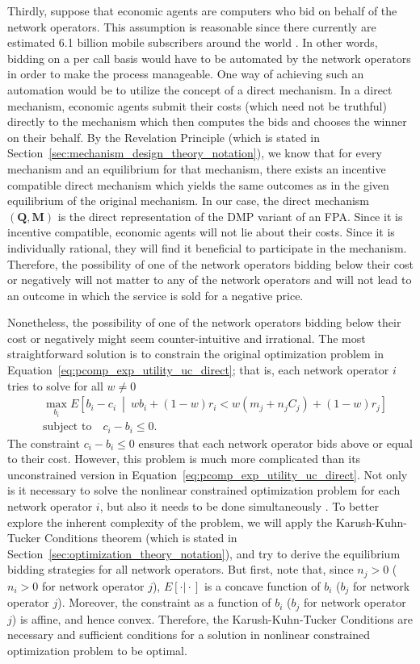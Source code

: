 Thirdly, suppose that economic agents are computers who bid on behalf of the network operators. This assumption is reasonable since there currently are estimated 6.1 billion mobile subscribers around the world \cite{Ericsson2011}. In other words, bidding on a per call basis would have to be automated by the network operators in order to make the process manageable. One way of achieving such an automation would be to utilize the concept of a direct mechanism. In a direct mechanism, economic agents submit their costs (which need not be truthful) directly to the mechanism which then computes the bids and chooses the winner on their behalf. By the Revelation Principle (which is stated in Section~\ref{sec:mechanism_design_theory_notation}), we know that for every mechanism and an equilibrium for that mechanism, there exists an incentive compatible direct mechanism which yields the same outcomes as in the given equilibrium of the original mechanism. In our case, the direct mechanism $(\mathbf{Q},\mathbf{M})$ is the direct representation of the DMP variant of an FPA. Since it is incentive compatible, economic agents will not lie about their costs. Since it is individually rational, they will find it beneficial to participate in the mechanism. Therefore, the possibility of one of the network operators bidding below their cost or negatively will not matter to any of the network operators and will not lead to an outcome in which the service is sold for a negative price.

Nonetheless, the possibility of one of the network operators bidding below their cost or negatively might seem counter-intuitive and irrational. The most straightforward solution is to constrain the original optimization problem in Equation~\eqref{eq:pcomp_exp_utility_uc_direct}; that is, each network operator $i$ tries to solve for all $w\neq 0$
\begin{align}
	\label{eq:pcomp_exp_utility_c_direct}
	&\max_{b_i}E \left[ b_i-c_i \:\middle\vert\: wb_i + (1-w)r_i < w(m_j + n_j C_j) + (1-w)r_j\right]\\
	&\text{subject to}\quad c_i-b_i\le 0.\nonumber
\end{align}
The constraint $c_i-b_i\le 0$ ensures that each network operator bids above or equal to their cost. However, this problem is much more complicated than its unconstrained version in Equation~\eqref{eq:pcomp_exp_utility_uc_direct}. Not only is it necessary to solve the nonlinear constrained optimization problem for each network operator $i$, but also it needs to be done simultaneously \cite{Griffin2011}. To better explore the inherent complexity of the problem, we will apply the Karush-Kuhn-Tucker Conditions theorem (which is stated in Section~\ref{sec:optimization_theory_notation}), and try to derive the equilibrium bidding strategies for all network operators. But first, note that, since $n_j>0$ ($n_i>0$ for network operator $j$), $E[\cdot \vert \cdot]$ is a concave function of $b_i$ ($b_j$ for network operator $j$). Moreover, the constraint as a function of $b_i$ ($b_j$ for network operator $j$) is affine, and hence convex. Therefore, the Karush-Kuhn-Tucker Conditions are necessary and sufficient conditions for a solution in nonlinear constrained optimization problem to be optimal.

